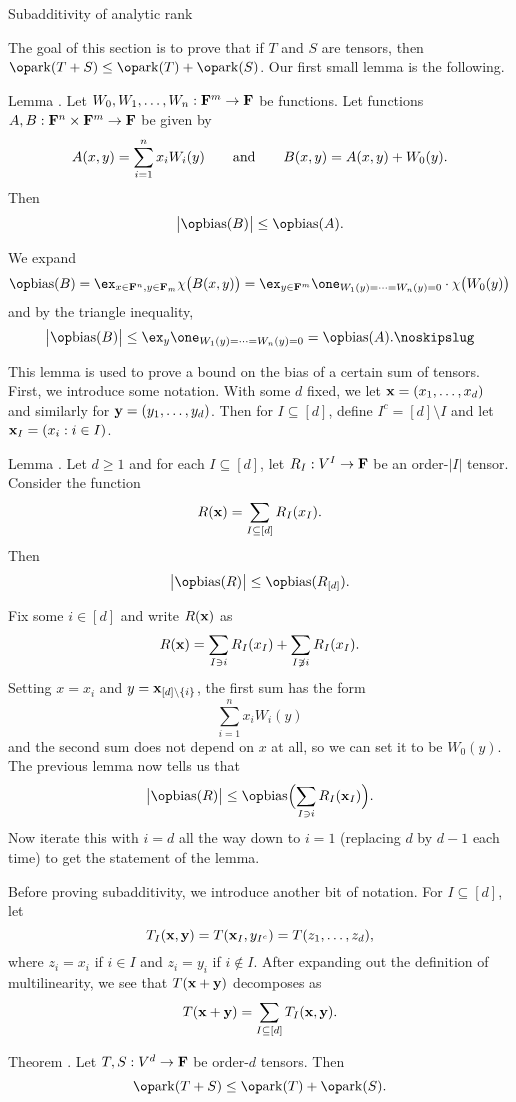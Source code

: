\advsect Subadditivity of analytic rank

The goal of this section is to prove that if $T$ and $S$ are tensors, then $\ark(T+S)\le \ark(T)+\ark(S)$.
Our first small lemma is the following.

\proclaim Lemma \advthm. Let $W_0, W_1,\ldots,W_n : {\bf F}^m\to {\bf F}$ be functions. Let
functions $A,B : {\bf F}^n\times {\bf F}^m\to {\bf F}$ be given by
$$A(x,y) = \sum_{i=1}^n x_i W_i(y)\qquad\hbox{and}\qquad B(x,y) = A(x,y) + W_0(y).$$
Then
$$\bigl| \bias(B)\bigr| \le \bias(A).$$

\proof We expand
$$\bias(B) = \ex_{x\in \FF^n, y\in \FF_m} \chi\bigl(B(x,y)\bigr)
= \ex_{y\in \FF^m} \one_{W_1(y) = \cdots = W_n(y) = 0} \cdot \chi\bigl(W_0(y)\bigr)$$
and by the triangle inequality,
$$\bigl|\bias(B)\bigr| \le \ex_y \one_{W_1(y) = \cdots = W_n(y) = 0} = \bias(A).\noskipslug$$

This lemma is used to prove a bound on the bias of a certain sum of tensors.
First, we introduce some notation. With some $d$ fixed, we let ${\bf x} = (x_1,\ldots,x_d)$ and
similarly for ${\bf y} = (y_1,\ldots,y_d)$. Then for
$I\subseteq [d]$, define $I^c = [d]\setminus I$ and let ${\bf x}_I = (x_i : i\in I)$.

\edef\normbound{\the\thmcount}
\proclaim Lemma \advthm. Let $d\ge 1$ and for each $I\subseteq [d]$, let $R_I : V^I\to {\bf F}$
be an order-$|I|$ tensor. Consider the function
$$R({\bf x}) = \sum_{I\subseteq [d]} R_I(x_I).$$
Then
$$\bigl|\bias(R)\bigr| \le \bias(R_{[d]}).$$

\proof Fix some $i\in [d]$ and write $R({\bf x})$ as
$$R({\bf x}) = \sum_{I \ni i} R_I(x_I) + \sum_{I\not\ni i} R_I(x_I).$$
Setting $x = x_i$ and $y = {\bf x}_{[d]\setminus\{i\}}$, the first sum has the form
$$\sum_{i=1}^n x_iW_i(y)$$ and the second sum does not depend on $x$ at all, so we can set it
to be $W_0(y)$. The previous lemma now tells us that
$$\bigl|\bias(R)\bigr| \le \bias\Bigl(\sum_{I\ni i} R_I(\x_I)\Bigr).$$
Now iterate this with $i=d$ all the way down to $i=1$ (replacing $d$ by $d-1$ each time)
to get the statement of the lemma.\slug

Before proving subadditivity, we introduce another bit of notation. For $I\subseteq [d]$,
let
$$T_I({\bf x},{\bf y}) = T({\bf x}_I, y_{I^c}) = T(z_1, \ldots, z_d),$$
where $z_i = x_i$ if $i\in I$ and $z_i = y_i$ if $i\notin I$. After expanding out the definition
of multilinearity, we see that $T({\bf x}+{\bf y})$ decomposes as
$$ T({\bf x}+{\bf y}) = \sum_{I\subseteq[d]} T_I({\bf x},{\bf y}).$$

\edef\subadditivity{\the\thmcount}
\proclaim Theorem \advthm. Let $T,S: V^d\to {\bf F}$ be order-$d$ tensors. Then
$$\ark(T+S) \le \ark(T) + \ark(S).$$

